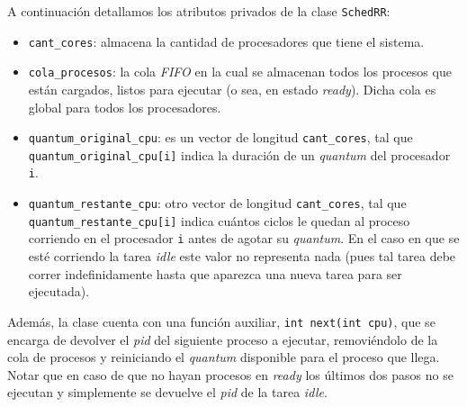 A continuación detallamos los atributos privados de la clase \texttt{SchedRR}:
\begin{itemize}
	\item \texttt{cant\_cores}: almacena la cantidad de procesadores que tiene el sistema.
	\item \texttt{cola\_procesos}: la cola \emph{FIFO} en la cual se almacenan todos los procesos que están cargados, listos para ejecutar (o sea, en estado \emph{ready}). Dicha cola es global para todos los procesadores.
	\item \texttt{quantum\_original\_cpu}: es un vector de longitud \texttt{cant\_cores}, tal que \texttt{quantum\_original\_cpu[i]} indica la duración de un \emph{quantum} del procesador \texttt{i}.
	\item \texttt{quantum\_restante\_cpu}: otro vector de longitud \texttt{cant\_cores}, tal que \texttt{quantum\_restante\_cpu[i]} indica cuántos ciclos le quedan al proceso corriendo en el procesador \texttt{i} antes de agotar su \emph{quantum}. En el caso en que se esté corriendo la tarea \emph{idle} este valor no representa nada (pues tal tarea debe correr indefinidamente hasta que aparezca una nueva tarea para ser ejecutada).
\end{itemize}

Además, la clase cuenta con una función auxiliar, \texttt{int next(int cpu)}, que se encarga de devolver el \emph{pid} del siguiente proceso a ejecutar, removiéndolo de la cola de procesos y reiniciando el \emph{quantum} disponible para el proceso que llega. Notar que en caso de que no hayan procesos en \emph{ready} los últimos dos pasos no se ejecutan y simplemente se devuelve el \emph{pid} de la tarea \emph{idle}.

